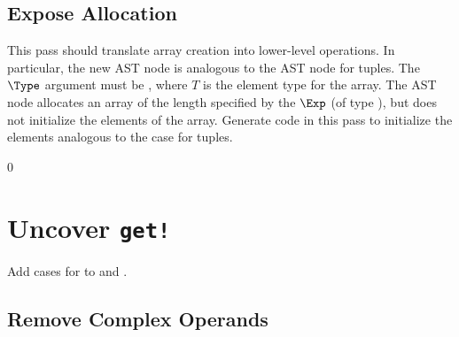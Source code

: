 \documentclass[7x10]{TimesAPriori_MIT}%
\def\racketEd{0}
\def\edition{1}
\numberwithin{theorem}{chapter}
\numberwithin{definition}{chapter}
\numberwithin{equation}{chapter}
\begin{document}


\subsection{Expose Allocation}

This pass should translate array creation into lower-level
operations. In particular, the new AST node \ALLOCARRAY{\Exp}{\Type}
is analogous to the  AST node for tuples.  The $\Type$
argument must be , where $T$ is the element type for the
array. The  AST node allocates an array of the
length specified by the $\Exp$ (of type \INTTY), but does not
initialize the elements of the array. Generate code in this pass to
initialize the elements analogous to the case for tuples.


{\if\edition\racketEd
\section{Uncover \texttt{get!}}
\label{sec:uncover-get-bang-vecof}

Add cases for  to  and
.

\fi}

\subsection{Remove Complex Operands}
\end{document}

